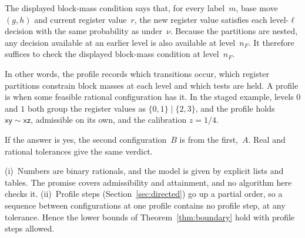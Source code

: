 The displayed block-mass condition says that, for every label~$m$, base
move $(g,h)$ and current register value~$r$, the new register value
satisfies each level-$\ell$ decision with the same probability as
under~$\nu$. Because the partitions are nested, any decision
available at an earlier level is also available at level~$n_F$. It
therefore suffices to check the displayed block-mass condition at
level~$n_F$.

In other words, the profile records which transitions occur, which register
partitions constrain block masses at each level and which tests are held. A
profile is  when some feasible rational configuration has
it. In the staged example, levels $0$ and $1$ both group the register
values as $\{0,1\}\mid\{2,3\}$, and the profile holds
$\mathsf{xy}\sim\mathsf{xz}$, admissible on its own, and the calibration
$z=1/4$.

\begin{center}
\end{center}

If the answer is yes, the second configuration~$B$ is
 from the first,~$A$. Real and rational
tolerances give the same verdict.

\begin{remark}\label{rem:inputs}
(i)~Numbers are binary rationals, and the model is given by explicit lists
and tables. The promise covers admissibility and attainment, and no
algorithm here checks it.
(ii)~Profile steps (Section~\ref{sec:directed}) go up a partial order, so a
sequence between configurations at one profile contains no profile step, at
any tolerance. Hence the lower bounds of Theorem~\ref{thm:boundary} hold
with profile steps allowed.
\end{remark}

